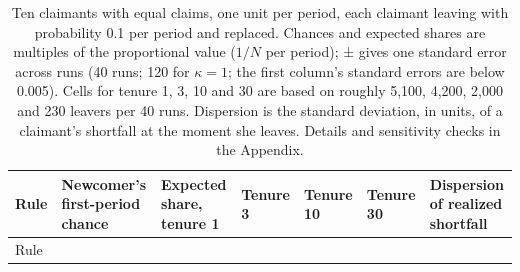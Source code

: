 \documentclass[
  11pt,
  letterpaper,
  DIV=11,
  numbers=noendperiod,
  twoside]{scrartcl}
\begin{document}
\begin{longtable}[]{@{}
  >{\raggedright\arraybackslash}p{}
  >{\raggedright\arraybackslash}p{}
  >{\raggedright\arraybackslash}p{}
  >{\raggedright\arraybackslash}p{}
  >{\raggedright\arraybackslash}p{}
  >{\raggedright\arraybackslash}p{}
  >{\raggedright\arraybackslash}p{}@{}}
\caption{Ten claimants with equal claims, one unit per period, each
claimant leaving with probability 0.1 per period and replaced. Chances
and expected shares are multiples of the proportional value (\(1/N\) per
period); ± gives one standard error across runs (40 runs; 120 for
\(\kappa = 1\); the first column's standard errors are below 0.005).
Cells for tenure 1, 3, 10 and 30 are based on roughly 5,100, 4,200,
2,000 and 230 leavers per 40 runs. Dispersion is the standard deviation,
in units, of a claimant's shortfall at the moment she leaves. Details
and sensitivity checks in the Appendix.}\label{tbl-churn}\tabularnewline
\toprule\noalign{}
\begin{minipage}[b]{\linewidth}\raggedright
Rule
\end{minipage} & \begin{minipage}[b]{\linewidth}\raggedright
Newcomer's first-period chance
\end{minipage} & \begin{minipage}[b]{\linewidth}\raggedright
Expected share, tenure 1
\end{minipage} & \begin{minipage}[b]{\linewidth}\raggedright
Tenure 3
\end{minipage} & \begin{minipage}[b]{\linewidth}\raggedright
Tenure 10
\end{minipage} & \begin{minipage}[b]{\linewidth}\raggedright
Tenure 30
\end{minipage} & \begin{minipage}[b]{\linewidth}\raggedright
Dispersion of realized shortfall
\end{minipage} \\
\midrule\noalign{}
\endfirsthead
\toprule\noalign{}
\begin{minipage}[b]{\linewidth}\raggedright
Rule
\end{minipage} & \begin{minipage}[b]{\linewidth}\raggedright

\end{minipage}
\end{longtable}
\end{document}
